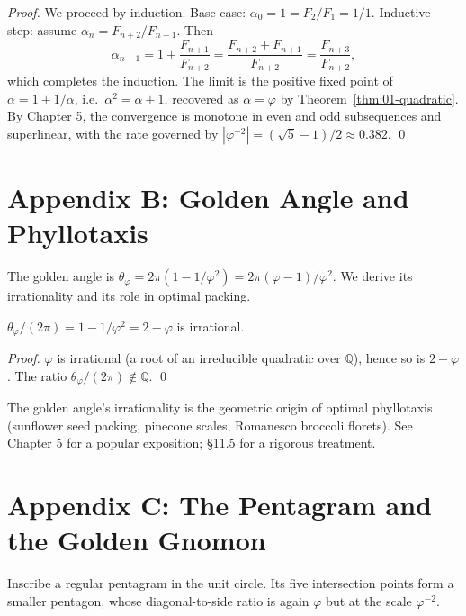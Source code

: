 \begin{proof}
We proceed by induction. Base case: $\alpha_0 = 1 = F_2/F_1 = 1/1$.
Inductive step: assume $\alpha_n = F_{n+2}/F_{n+1}$. Then
\[
  \alpha_{n+1} = 1 + \frac{F_{n+1}}{F_{n+2}} = \frac{F_{n+2} +
  F_{n+1}}{F_{n+2}} = \frac{F_{n+3}}{F_{n+2}},
\]
which completes the induction. The limit is the positive fixed point
of $\alpha = 1 + 1/\alpha$, i.e.\ $\alpha^2 = \alpha + 1$, recovered as
$\alpha = \varphi$ by Theorem~\ref{thm:01-quadratic}. By
\cite{koshy_fib_lucas} Chapter 5, the convergence is monotone in even
and odd subsequences and superlinear, with the rate governed by
$|\varphi^{-2}| = (\sqrt 5 - 1)/2 \approx 0.382$.
\qed
\end{proof}

\section*{Appendix B: Golden Angle and Phyllotaxis}
\label{sec:01-app-B}

The golden angle is $\theta_\varphi = 2\pi (1 - 1/\varphi^2) = 2\pi
(\varphi - 1)/\varphi^2$. We derive its irrationality and its role in
optimal packing.

\begin{lemma}\label{lem:01-golden-angle}
$\theta_\varphi / (2\pi) = 1 - 1/\varphi^2 = 2 - \varphi$ is
irrational.
\end{lemma}

\begin{proof}
$\varphi$ is irrational (a root of an irreducible quadratic over
$\mathbb{Q}$), hence so is $2 - \varphi$. The ratio
$\theta_\varphi / (2 \pi) \notin \mathbb{Q}$.
\qed
\end{proof}

\begin{remark}
The golden angle's irrationality is the geometric origin of optimal
phyllotaxis (sunflower seed packing, pinecone scales, Romanesco
broccoli florets). See \cite{livio_phi} Chapter 5 for a popular
exposition; \cite{coxeter_intro_geometry} \S 11.5 for a rigorous
treatment.
\end{remark}

\section*{Appendix C: The Pentagram and the Golden Gnomon}
\label{sec:01-app-C}

Inscribe a regular pentagram in the unit circle. Its five
intersection points form a smaller pentagon, whose diagonal-to-side
ratio is again $\varphi$ but at the scale $\varphi^{-2}$.

